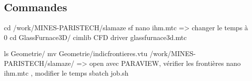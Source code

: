 \documentclass[12pt, a4paper, french, BCOR = 0pt, DIV = 10]{scrartcl}
\begin{document}
    \begin{appendices}
    \section{Commandes}
    cd /work/MINES-PARISTECH/slamaze
    sf
    nano ihm.mtc => changer le temps à 0
    cd GlassFurnace3D/
    cimlib CFD driver glassfurnace3d.mtc
    
    ls Geometrie/
    mv Geometrie/indicfrontieres.vtu /work/MINES-PARISTECH/slamaze/ => open avec PARAVIEW, vérifier les frontières
    nano ihm.mtc , modifier le temps
    sbatch job.sh
    \end{appendices}
	
\end{document}
